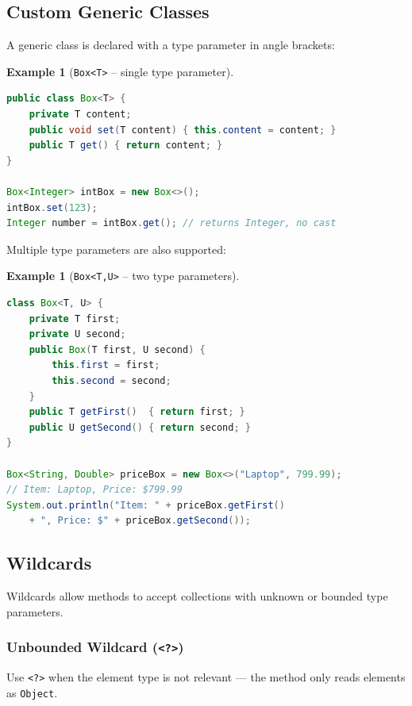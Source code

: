 \documentclass[11pt, a4paper, notitlepage]{report}
\theoremstyle{definition}
\theoremstyle{remark}
\theoremstyle{definition}
\newtheorem{example}[theorem]{Example}
\begin{document}
\subsection{Custom Generic Classes}
\label{subsec:ch10-custom-generic}

A generic class is declared with a type parameter in angle brackets:

\begin{example}[\texttt{Box<T>} -- single type parameter]
\leavevmode
\begin{lstlisting}[language=Java]
public class Box<T> {
    private T content;
    public void set(T content) { this.content = content; }
    public T get() { return content; }
}

Box<Integer> intBox = new Box<>();
intBox.set(123);
Integer number = intBox.get(); // returns Integer, no cast
\end{lstlisting}
\end{example}

Multiple type parameters are also supported:

\begin{example}[\texttt{Box<T,U>} -- two type parameters]
\leavevmode
\begin{lstlisting}[language=Java]
class Box<T, U> {
    private T first;
    private U second;
    public Box(T first, U second) {
        this.first = first;
        this.second = second;
    }
    public T getFirst()  { return first; }
    public U getSecond() { return second; }
}

Box<String, Double> priceBox = new Box<>("Laptop", 799.99);
// Item: Laptop, Price: $799.99
System.out.println("Item: " + priceBox.getFirst()
    + ", Price: $" + priceBox.getSecond());
\end{lstlisting}
\end{example}

\subsection{Wildcards}
\label{subsec:ch10-wildcards}

Wildcards allow methods to accept collections with unknown or bounded type parameters.

\subsubsection{Unbounded Wildcard (\texttt{<?>})}
Use \texttt{<?>} when the element type is not relevant — the method only reads
elements as \texttt{Object}.
\end{document}
